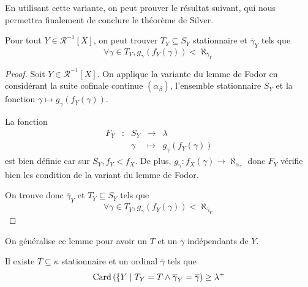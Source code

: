 En utilisant cette variante, on peut prouver le résultat suivant, qui nous
permettra finalement de conclure le théorème de Silver.

\begin{lemma}
  Pour tout $Y\in\mathcal R^{-1}[X]$, on peut trouver $T_Y\subseteq S_Y$
  stationnaire et $\overline\gamma_Y$ tels que
  \[\forall \gamma \in T_Y, g_\gamma(f_Y(\gamma)) <
  \aleph_{\overline\gamma_Y}\]
\end{lemma}

\begin{proof}
  Soit $Y\in\mathcal R^{-1}[X]$. On applique la variante du lemme de Fodor en
  considérant la suite cofinale continue $(\alpha_\beta)$, l'ensemble
  stationnaire $S_Y$ et la fonction $\gamma\mapsto g_\gamma(f_Y(\gamma))$.

  La fonction
  \[\begin{array}{ccccc}
  F_Y & : & S_Y & \longrightarrow & \lambda\\
  & & \gamma & \longmapsto & g_\gamma(f_Y(\gamma))
  \end{array}\]
  est bien définie car sur $S_Y, f_Y < f_X$. De plus,
  $g_\gamma : f_X(\gamma) \to \aleph_{\alpha_\gamma}$ donc $F_Y$ vérifie bien
  les condition de la variant du lemme de Fodor.

  On trouve donc $\overline\gamma_Y$ et $T_Y\subseteq S_Y$ tels que
  \[\forall \gamma \in T_Y, g_\gamma(f_Y(\gamma)) < \aleph_{\overline\gamma_Y}\]
\end{proof}

On généralise ce lemme pour avoir un $T$ et un $\overline\gamma$ indépendants
de $Y$.

\begin{lemma}
  Il existe $T\subseteq \kappa$ stationnaire et un ordinal $\overline\gamma$
  tels que
  \[\operatorname{Card}\left(\{Y\mid T_Y = T \land \overline\gamma_Y = \overline\gamma\right)
  \geq\lambda^+\]
\end{lemma}

